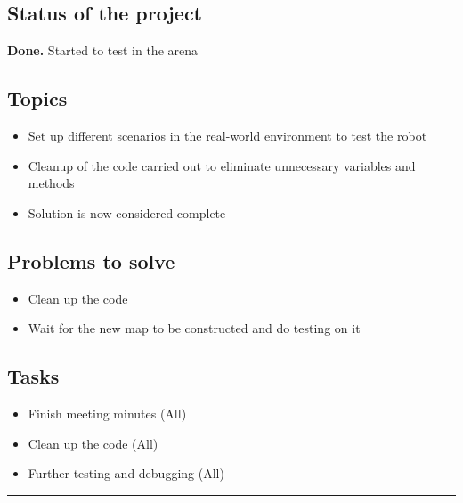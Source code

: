 \documentclass[a4paper, 12pt]{article}
\begin{document}
\subsection*{Status of the project}
\textbf{Done.} Started to test in the arena

\subsection*{Topics}
\begin{itemize}
\item Set up different scenarios in the real-world environment to test the robot
\item Cleanup of the code carried out to eliminate unnecessary variables and methods 
\item Solution is now considered complete
\end{itemize}
\subsection*{Problems to solve}
\begin{itemize}
\item Clean up the code
\item Wait for the new map to be constructed and do testing on it
\end{itemize}

\subsection*{Tasks}
\begin{itemize}
\item Finish meeting minutes (All)
\item Clean up the code (All)
\item Further testing and debugging (All)
\end{itemize}
\noindent\rule{\textwidth}{1pt}
\end{document}
